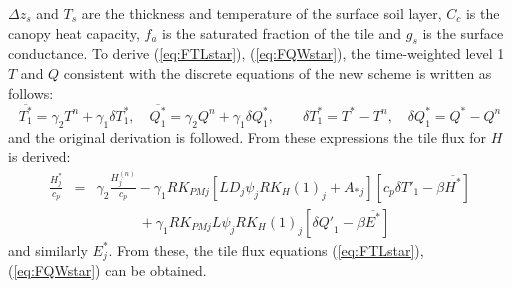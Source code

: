 \documentclass{UMDP_article}
\begin{document}
$\Delta z_s$ and $T_s$ are the thickness and temperature of the
surface soil layer, $C_c$ is the canopy heat capacity, $f_a$ is the
saturated fraction of the tile and $g_s$ is the surface
conductance. To derive (\ref{eq:FTLstar}), (\ref{eq:FQWstar}), the
time-weighted level 1 $T$ and $Q$ consistent with the discrete
equations of the new scheme is written as follows:
\begin{equation*}
  \overline{T_{1}^{*}}=\gamma_{2}T^{n}+\gamma_{1}\delta T_{1}^{*},\quad\overline{Q_{1}^{*}}=\gamma_{2}Q^{n}+\gamma_{1}\delta Q_{1}^{*},\qquad\delta T_{1}^{*}=T^{*}-T^{n},\quad\delta Q_{1}^{*}=Q^{*}-Q^{n}
\end{equation*}
and the original derivation is followed. From these expressions the
tile flux for $H$ is derived:
\begin{eqnarray*}
  \frac{H_{j}^{*}}{c_{p}} & = & \gamma_{2}\frac{H_{j}^{(n)}}{c_{p}}-\gamma_{1}RK_{PMj}[LD_{j}\psi_{j}RK_{H}(1)_{j}+A_{*j}][c_{p}\delta{T'}_{1}-\beta\overline{H^{*}}]\\
  &  & \qquad\quad+\gamma_{1}RK_{PMj}L\psi_{j}RK_{H}(1)_{j}[\delta{Q'}_{1}-\beta\overline{E^{*}}]
\end{eqnarray*}
and similarly $E_{j}^{*}$. From these, the tile flux equations
(\ref{eq:FTLstar}), (\ref{eq:FQWstar}) can be obtained.
\end{document}
